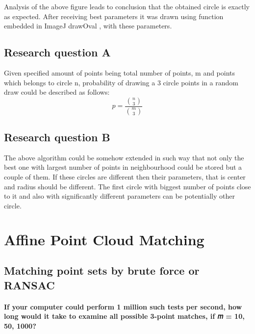 \documentclass[notitlepage,english]{hgbreport}
\begin{document}
Analysis of the above figure leads to conclusion that the obtained circle is exactly as expected. After receiving best parameters it was drawn using function embedded in ImageJ drawOval , with these parameters.




\section {Research question A}

Given specified amount of points being total number of points, m and points which belongs to circle n, probability of drawing a 3 circle points in a random draw could be described as follows:
\[p=\frac{\binom{n}{3}}{\binom{m}{3}}\]


\section {Research question B}

The above algorithm could be somehow extended in such way that not only the best one with largest number of points in neighbourhood could be stored but a couple of them. If these circles are different then their parameters, that is center and radius should be different. The first circle with biggest number of points close to it and also with significantly different parameters can be potentially other circle. 




\chapter{Affine Point Cloud Matching}
\section {Matching point sets by brute force or RANSAC}
\subsubsection{If your computer could perform 1 million such tests per second, how long
would it take to examine all possible 3-point matches, if 𝑚 = 10, 50, 1000?}
\end{document}
